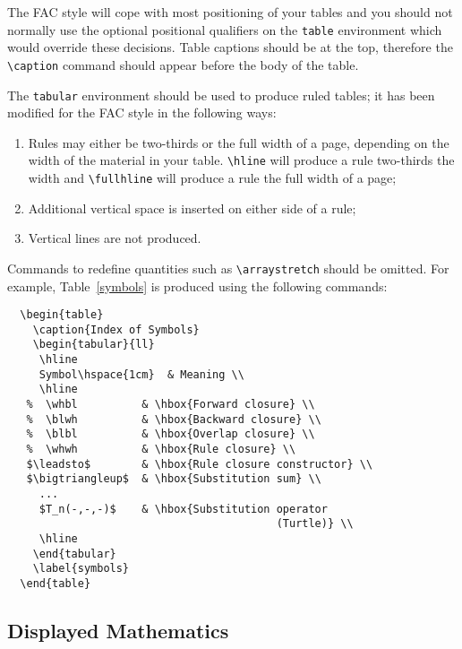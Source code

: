 The FAC style will cope with most positioning of your tables
and you should not normally use the optional positional qualifiers on the
\verb"table" environment which would override these decisions.
Table captions should be at the top, therefore the \verb"\caption" command
should appear before the body of the table.

The \verb"tabular" environment should be used to produce ruled tables;
it has been modified for the FAC style in the following ways:
%
\begin{enumerate}
  \item Rules may either be two-thirds or the full width of a page,
depending on the width of the material in your table. \verb"\hline"
will produce a rule two-thirds the width and \verb"\fullhline" will
produce a rule the full width of a page;
  \item Additional vertical space is inserted on either side of a rule;
  \item Vertical lines are not produced.
\end{enumerate}
%
Commands to redefine quantities such as \verb"\arraystretch" should be
omitted.
For example, Table~\ref{symbols} is produced using the following
commands:
%
\begin{verbatim}
  \begin{table}
    \caption{Index of Symbols}
    \begin{tabular}{ll}
     \hline
     Symbol\hspace{1cm}  & Meaning \\
     \hline
   %  \whbl          & \hbox{Forward closure} \\
   %  \blwh          & \hbox{Backward closure} \\
   %  \blbl          & \hbox{Overlap closure} \\
   %  \whwh          & \hbox{Rule closure} \\
   $\leadsto$        & \hbox{Rule closure constructor} \\
   $\bigtriangleup$  & \hbox{Substitution sum} \\
     ...
     $T_n(-,-,-)$    & \hbox{Substitution operator
                                          (Turtle)} \\
     \hline
    \end{tabular}
    \label{symbols}
  \end{table}
\end{verbatim}

\subsection{Displayed Mathematics}

